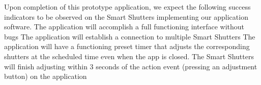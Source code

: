 Upon completion of this prototype application, we expect the following success indicators to be observed on the Smart Shutters implementing our application software. \newline
The application will accomplish a full functioning interface without bugs\newline
The application will establish a connection to multiple Smart Shutters\newline
The application will have a functioning preset timer that adjusts the corresponding shutters at the scheduled time even when the app is closed.\newline
The Smart Shutters will finish adjusting within 3 seconds of the action event (pressing an adjustment button) on the application
